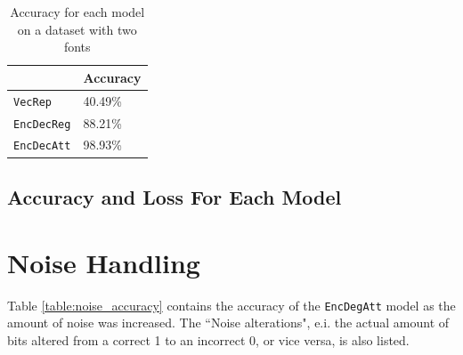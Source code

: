 \begin{table}[H]
    \centering
    \begin{tabular}{|l|l|}
        \hline 
                                        & \textbf{Accuracy}         \\ \hline
        {\tt VecRep }                   & 40.49\%                   \\ \hline
        {\tt EncDecReg}                 & 88.21\%                   \\ \hline
        {\tt EncDecAtt}                 & 98.93\%                   \\ \hline
    \end{tabular}
    \caption{Accuracy for each model on a dataset with two fonts}
    \label{table:accuracy_two_fonts}
\end{table}

\subsection{Accuracy and Loss For Each Model}


\section{Noise Handling}
\label{sec:noise_handling}
Table \ref{table:noise_accuracy} contains the accuracy of the {\tt EncDegAtt} model as the amount of noise was increased. The ``Noise alterations", e.i. the actual amount of bits altered from a correct 1 to an incorrect 0, or vice versa, is also listed. 

